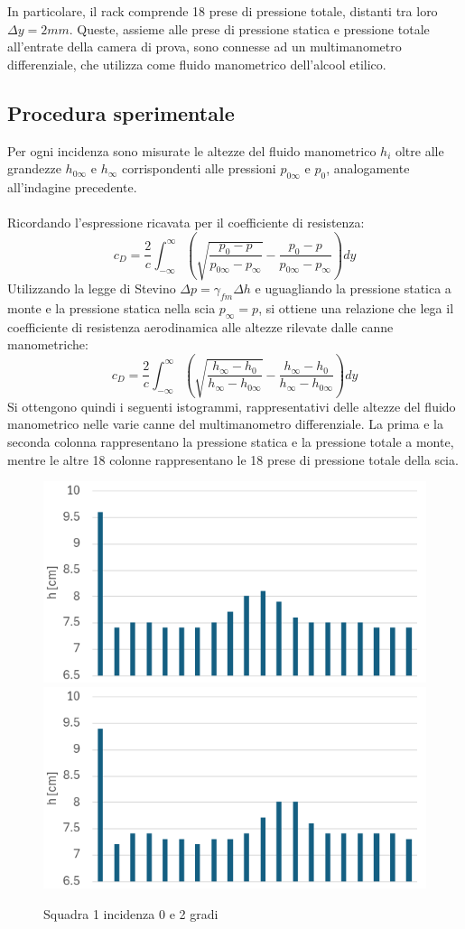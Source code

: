 \noindent In particolare, il rack comprende 18 prese di pressione totale, distanti tra loro $\Delta y= 2mm$. Queste, assieme alle prese di pressione statica e pressione totale all'entrate della camera di prova, sono connesse ad un multimanometro differenziale, che utilizza come fluido manometrico dell'alcool etilico.

\subsection{Procedura sperimentale}\label{istogrammiscia}
Per ogni incidenza sono misurate le altezze del fluido manometrico $h_i$ oltre alle grandezze $h_{0\infty}$ e $h_\infty$ corrispondenti alle pressioni $p_{0\infty}$ e $p_0$, analogamente all'indagine precedente.\\\\
Ricordando l'espressione ricavata per il coefficiente di resistenza:
\begin{equation*}
    c_D = \frac 2c \int_{-\infty}^{\infty} \left( \sqrt{\frac{p_0 - p}{p_{0\infty} - p_\infty}} - \frac{p_0 - p}{p_{0\infty} - p_\infty} \right) dy
\end{equation*}
Utilizzando la legge di Stevino $\Delta p = \gamma_{fm} \Delta h$ e uguagliando la pressione statica a monte e la pressione statica nella scia $p_{\infty}=p$, si ottiene una relazione che lega il coefficiente di resistenza aerodinamica alle altezze rilevate dalle canne manometriche:
\begin{equation*}
    c_D = \frac 2c \int_{-\infty}^\infty \left( \sqrt{\frac{h_\infty - h_0}{h_\infty - h_{0\infty}}} - \frac{h_\infty - h_0}{h_\infty - h_{0\infty}} \right) dy 
\end{equation*}
Si ottengono quindi i seguenti istogrammi, rappresentativi delle altezze del fluido manometrico nelle varie canne del multimanometro differenziale. La prima e la seconda colonna rappresentano la pressione statica e la pressione totale a monte, mentre le altre 18 colonne rappresentano le 18 prese di pressione totale della scia.
\begin{figure}[H]
    \centering
    \includegraphics[width=.49\textwidth]{images/6/s1a0.png}
    \includegraphics[width=.49\textwidth]{images/6/s1a2.png}
    \caption{Squadra 1 incidenza 0 e 2 gradi}
\end{figure}
